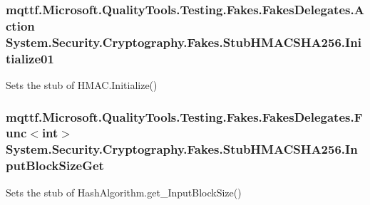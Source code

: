 \hypertarget{class_system_1_1_security_1_1_cryptography_1_1_fakes_1_1_stub_h_m_a_c_s_h_a256_a3b6a2f77fd95da32a807c7b0807bf5a4}{
\subsubsection[{Initialize01}]{\setlength{\rightskip}{0pt plus 5cm}mqttf.\-Microsoft.\-Quality\-Tools.\-Testing.\-Fakes.\-Fakes\-Delegates.\-Action System.\-Security.\-Cryptography.\-Fakes.\-Stub\-H\-M\-A\-C\-S\-H\-A256.\-Initialize01}}\label{class_system_1_1_security_1_1_cryptography_1_1_fakes_1_1_stub_h_m_a_c_s_h_a256_a3b6a2f77fd95da32a807c7b0807bf5a4}


Sets the stub of H\-M\-A\-C.\-Initialize()

\hypertarget{class_system_1_1_security_1_1_cryptography_1_1_fakes_1_1_stub_h_m_a_c_s_h_a256_a6d9ac946c5be23da46503c29645a77b4}{
\subsubsection[{Input\-Block\-Size\-Get}]{\setlength{\rightskip}{0pt plus 5cm}mqttf.\-Microsoft.\-Quality\-Tools.\-Testing.\-Fakes.\-Fakes\-Delegates.\-Func$<$int$>$ System.\-Security.\-Cryptography.\-Fakes.\-Stub\-H\-M\-A\-C\-S\-H\-A256.\-Input\-Block\-Size\-Get}}\label{class_system_1_1_security_1_1_cryptography_1_1_fakes_1_1_stub_h_m_a_c_s_h_a256_a6d9ac946c5be23da46503c29645a77b4}


Sets the stub of Hash\-Algorithm.\-get\-\_\-\-Input\-Block\-Size()

